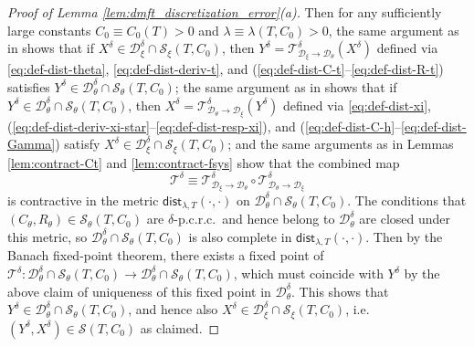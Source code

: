 \documentclass[11pt,letterpaper,reqno]{amsart}
\theoremstyle{definition}
\def\cS{\mathcal{S}}
\def\cD{\mathcal{D}}
\def\trsfrmD{\mathcal{T}^\delta}
\def\trsfrmDA{\mathcal{T}^\delta_{\mathcal{D}_\xi \to {\mathcal{D}}_\theta}}
\def\trsfrmDB{\mathcal{T}^\delta_{{\mathcal{D}}_\theta \to \mathcal{D}_\xi}}
\newcommand{\lbddst}[2]{\mathsf{dist}_{\lambda,T}(#1,#2)}
\begin{document}
\begin{proof}[Proof of Lemma \ref{lem:dmft_discretization_error}(a)]
Then for any sufficiently large constants $C_0 \equiv C_0(T)>0$
and $\lambda \equiv \lambda(T,C_0)>0$,
the same argument as in  shows that 
if $X^\delta \in \cD_\xi^\delta \cap \cS_\xi(T,C_0)$, then 
$Y^\delta=\trsfrmDA(X^\delta)$ defined via
\eqref{eq:def-dist-theta}, \eqref{eq:def-dist-deriv-t}, and 
(\ref{eq:def-dist-C-t}--\ref{eq:def-dist-R-t}) satisfies
$Y^\delta \in \cD_\theta^\delta \cap \cS_\theta(T,C_0)$;
the same argument as in  shows that if
$Y^\delta \in \cD_\theta^\delta \cap \cS_\theta(T,C_0)$, then 
$X^\delta=\trsfrmDB(Y^\delta)$ defined via
\eqref{eq:def-dist-xi},
(\ref{eq:def-dist-deriv-xi-star}--\ref{eq:def-dist-resp-xi}), and
(\ref{eq:def-dist-C-h}--\ref{eq:def-dist-Gamma}) satisfy
$X^\delta \in \cD_\xi^\delta \cap \cS_\xi(T,C_0)$;
and the same arguments as in Lemmas \ref{lem:contract-Ct} and
\ref{lem:contract-fsys} show that the combined map
\[\trsfrmD \equiv \trsfrmDA \circ \trsfrmDB\]
is contractive in the metric $\lbddst{\cdot}{\cdot}$ on
$\cD_\theta^\delta \cap \cS_\theta(T,C_0)$. The conditions that
$(C_\theta,R_\theta) \in \cS_\theta(T,C_0)$ are $\delta$-p.c.r.c.\ and
hence belong to $\cD_\theta^\delta$ are closed under this metric, so
$\cD_\theta^\delta \cap \cS_\theta(T,C_0)$ is also complete 
in $\lbddst{\cdot}{\cdot}$. Then by the Banach fixed-point theorem,
there exists a fixed point of $\trsfrmD:\cD_\theta^\delta \cap \cS_\theta(T,C_0)
\to \cD_\theta^\delta \cap \cS_\theta(T,C_0)$,
which must coincide with $Y^\delta$
by the above claim of uniqueness of this fixed point in $\cD_\theta^\delta$.
This shows that $Y^\delta \in 
\cD_\theta^\delta \cap \cS_\theta(T,C_0)$, and hence also
$X^\delta \in \cD_\xi^\delta \cap \cS_\xi(T,C_0)$,
i.e.\ $(Y^\delta,X^\delta) \in \cS(T,C_0)$ as claimed.
\end{proof}
\end{document}
